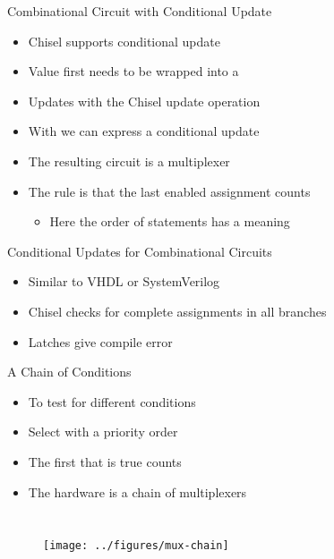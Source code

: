 \begin{frame}[fragile]{Combinational Circuit with Conditional Update}
\begin{itemize}
\item Chisel supports conditional update
\item Value first needs to be wrapped into a 
\item Updates with the Chisel update operation \code{:=}
\item With  we can express a conditional update
\item The resulting circuit is a multiplexer
\item The rule is that the last enabled assignment counts
\begin{itemize}
\item Here the order of statements has a meaning
\end{itemize}
\end{itemize}
\end{frame}

\begin{frame}[fragile]{Conditional Updates for Combinational Circuits}
\begin{itemize}
\item Similar to VHDL  or SystemVerilog 
\item Chisel checks for complete assignments in all branches
\item Latches give compile error
\end{itemize}
\end{frame}

\begin{frame}[fragile]{A Chain of Conditions}
\begin{itemize}
\item To test for different conditions
\item Select with a priority order
\item The first that is true counts
\item The hardware is a chain of multiplexers
\end{itemize}
\begin{columns}
\begin{figure}
  \texttt{[image: ../figures/mux-chain]}
\end{figure}
\end{columns}
\end{frame}

